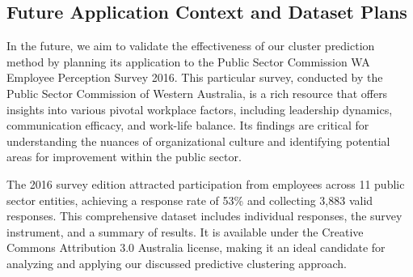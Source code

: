 \documentclass{article}
\begin{document}





\subsection{Future Application Context and Dataset Plans}

In the future, we aim to validate the effectiveness of our cluster prediction method by planning its application to the Public Sector Commission WA Employee Perception Survey 2016. 
This particular survey, conducted by the Public Sector Commission of Western Australia, is a rich resource that offers insights into various pivotal workplace factors, including leadership dynamics, communication efficacy, and work-life balance. 
Its findings are critical for understanding the nuances of organizational culture and identifying potential areas for improvement within the public sector.

The 2016 survey edition attracted participation from employees across 11 public sector entities, achieving a response rate of 53\% and collecting 3,883 valid responses. 
This comprehensive dataset includes individual responses, the survey instrument, and a summary of results. It is available under the Creative Commons Attribution 3.0 Australia license, making it an ideal candidate for analyzing and applying our discussed predictive clustering approach.
\end{document}
